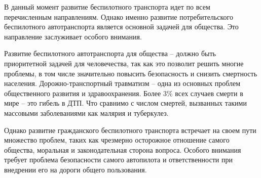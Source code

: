 В данный момент развитие беспилотного транспорта идет по всем перечисленным 
направлениям. Однако именно развитие потребительского беспилотного 
автотранспорта является основной задачей для общества. Это направление 
заслуживает особого внимания.


Развитие беспилотного автотранспорта для общества – должно быть приоритетной 
задачей для человечества, так как это позволит решить многие проблемы, в том 
числе значительно повысить безопасность и снизить смертность населения.
Дорожно-транспортный травматизм – одна из основных проблем общественного 
развития и здравоохранения. Более 3\% 
всех случаев смерти в мире -- это гибель в ДТП. Что сравнимо с числом смертей, 
вызванных такими массовыми заболеваниями как малярия и туберкулез. 

Однако развитие гражданского беспилотного транспорта встречает на своем пути 
множество проблем, таких как чрезмерно осторожное отношение самого общества,
моральная и законодательная сторона вопроса. Особого внимания требует проблема 
безопасности самого автопилота и ответственности при внедрении 
его на дороги общего пользования.

